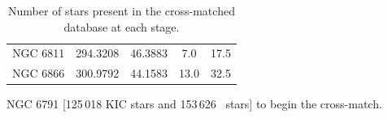 \begin{table}[h]
    \centering
    \setlength\tabcolsep{10pt}
    \begin{tabular}{ccccc}
        \hline
        NGC 6811    & 294.3208  & 46.3883   & 7.0               & 17.5\\
        NGC 6866    & 300.9792  & 44.1583   & 13.0              & 32.5\\
        \hline
    \end{tabular}
    \caption{Number of stars present in the cross-matched database at each stage.}
    \label{tab:cluster_crossmatch}
\end{table}


NGC 6791  [125\,018 KIC stars and 153\,626 \Gaia~stars] to begin the cross-match.





